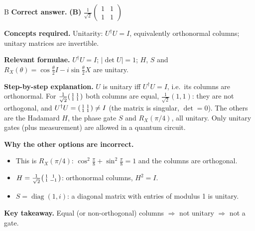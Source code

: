 \documentclass[11pt,a4paper]{article}
\newcommand{\qsep}{\par\vspace{2pt}{\color{black!15}\hrule}\vspace{4pt}}
\begin{document}
\begin{solbox}{B}
\textbf{\color{brand}Correct answer.} \textcolor{okgreen}{\textbf{(B)}} $\frac{1}{\sqrt2}\begin{pmatrix}1 & 1\\ 1 & 1\end{pmatrix}$

\textbf{\color{brand}Concepts required.} Unitarity: $U^\dagger U = I$, equivalently orthonormal columns; unitary matrices are invertible.

\textbf{\color{brand}Relevant formulae.} $U^\dagger U = I$; $|\det U| = 1$; $H$, $S$ and $R_X(\theta) = \cos\frac\theta2I - i\sin\frac\theta2X$ are unitary.

\textbf{\color{brand}Step-by-step explanation.} $U$ is unitary iff $U^\dagger U = I$, i.e.\ its columns are orthonormal. For $\frac{1}{\sqrt2}\begin{psmallmatrix}1&1\\1&1\end{psmallmatrix}$ both
columns are equal, $\frac{1}{\sqrt2}(1,1)$: they are not orthogonal, and $U^\dagger U = \begin{psmallmatrix}1&1\\1&1\end{psmallmatrix} \neq I$
(the matrix is singular, $\det = 0$). The others are the Hadamard $H$, the phase gate $S$ and $R_X(\pi/4)$, all unitary.
Only unitary gates (plus measurement) are allowed in a quantum circuit.

\textbf{\color{brand}Why the other options are incorrect.}
\begin{itemize}[leftmargin=2.4em, itemsep=1pt, topsep=2pt]
\item[\textbf{(A)}] This is $R_X(\pi/4)$: $\cos^2\frac\pi8 + \sin^2\frac\pi8 = 1$ and the columns are orthogonal.
\item[\textbf{(C)}] $H = \frac{1}{\sqrt2}\begin{psmallmatrix}1&1\\1&-1\end{psmallmatrix}$: orthonormal columns, $H^2 = I$.
\item[\textbf{(D)}] $S = \operatorname{diag}(1, i)$: a diagonal matrix with entries of modulus 1 is unitary.
\end{itemize}
\textbf{\color{brand}Key takeaway.} Equal (or non-orthogonal) columns $\Rightarrow$ not unitary $\Rightarrow$ not a gate.
\end{solbox}
\qsep
\end{document}
